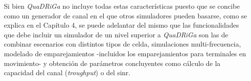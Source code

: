 Si bien \textit{QuaDRiGa} no incluye todas estas características puesto que se concibe como un generador de canal en el que otros simuladores pueden basarse, como se explica en el Capítulo 4, se puede adelantar del mismo que las funcionalidades que debe incluir un simulador de un nivel superior a \textit{QuaDRiGa} son las de combinar escenarios con distintos tipos de celda, simulaciones multi-frecuencia, modelado de emparejamientos -incluidos los emparejamientos para terminales en movimiento- y obtención de parámetros concluyentes como cálculo de la capacidad del canal (\textit{troughput}) o del \ac{sinr}.